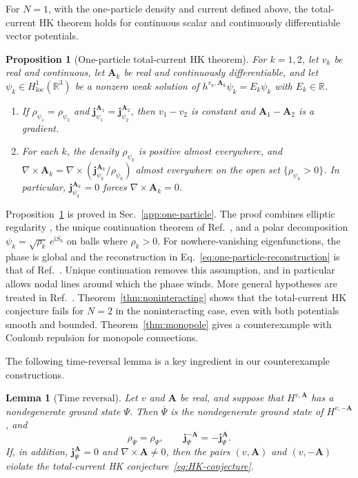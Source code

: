 \documentclass[11pt,a4paper]{article}
\newtheorem{proposition}[theorem]{Proposition}
\newtheorem{lemma}[theorem]{Lemma}
\theoremstyle{remark}
\theoremstyle{plain}
\newcommand{\R}{\mathbb R}
\newcommand{\jj}{\mathbf j}
\newcommand{\A}{\mathbf A}
\begin{document}
For $N=1$, with the one-particle density and current defined
above, the total-current HK theorem holds for
continuous scalar and continuously differentiable vector potentials.

\begin{proposition}[One-particle total-current HK theorem]
\label{prop:one-particle}
For $k=1,2$, let $v_k$ be real and continuous, let $\A_k$ be real and
continuously differentiable, and let
$\psi_k\in H^1_{\mathrm{loc}}(\R^3)$ be a nonzero weak solution of
$h^{v_k,\A_k}\psi_k=E_k\psi_k$ with $E_k\in\R$.
\begin{enumerate}
 \renewcommand{\theenumi}{(\roman{enumi})}%
 \renewcommand{\labelenumi}{\textup{\theenumi}}%
 \item\label{prop:one-particle-hk}
 If $\rho_{\psi_1}=\rho_{\psi_2}$ and
 $\jj_{\psi_1}^{\A_1}=\jj_{\psi_2}^{\A_2}$, then $v_1-v_2$ is
 constant and $\A_1-\A_2$ is a gradient.
 \item\label{prop:one-particle-curl}
 For each $k$, the density $\rho_{\psi_k}$ is positive almost
 everywhere, and
 $\nabla\times\A_k=\nabla\times(\jj_{\psi_k}^{\A_k}/\rho_{\psi_k})$
 almost everywhere on the open set $\{\rho_{\psi_k}>0\}$. In
 particular, $\jj_{\psi_k}^{\A_k}=0$ forces $\nabla\times\A_k=0$.
\end{enumerate}
\end{proposition}

Proposition~\ref{prop:one-particle} is proved in
Sec.~\ref{app:one-particle}. The proof combines elliptic
regularity \cite{GT2001}, the unique continuation theorem of
Ref.~\cite{Garrigue2020}, and a polar decomposition
$\psi_k=\sqrt{\rho_k}\,e^{\mathrm{i}S_k}$ on balls where $\rho_k>0$.
For nowhere-vanishing eigenfunctions, the
phase is global and the reconstruction in
Eq.~\eqref{eq:one-particle-reconstruction} is that of
Ref.~\cite{Tellgren2012}. Unique continuation removes this assumption,
and in particular allows nodal lines around which the phase winds.
More general hypotheses are treated in Ref.~\cite{LB2014}.
Theorem~\ref{thm:noninteracting} shows that the
total-current HK conjecture fails for $N=2$ in the noninteracting case,
even with both potentials smooth and bounded.
Theorem~\ref{thm:monopole} gives a counterexample with Coulomb
repulsion for monopole connections.

The following time-reversal lemma is a key ingredient in our
counterexample constructions.

\begin{lemma}[Time reversal]
\label{lem:time-reversal}
Let $v$ and $\A$ be real, and suppose that $H^{v,\A}$ has a
nondegenerate ground state $\Psi$. Then $\overline\Psi$ is the
nondegenerate ground state of $H^{v,-\A}$, and
\begin{equation}
 \rho_{\overline\Psi}=\rho_\Psi,\qquad
 \jj_{\overline\Psi}^{-\A}=-\jj_{\Psi}^{\A}.
 \label{eq:time-reversal}
\end{equation}
If, in addition, $\jj_{\Psi}^{\A}=0$ and $\nabla\times\A\ne0$, then the
pairs $(v,\A)$ and $(v,-\A)$ violate the total-current HK
conjecture~\eqref{eq:HK-conjecture}.
\end{lemma}
\end{document}
